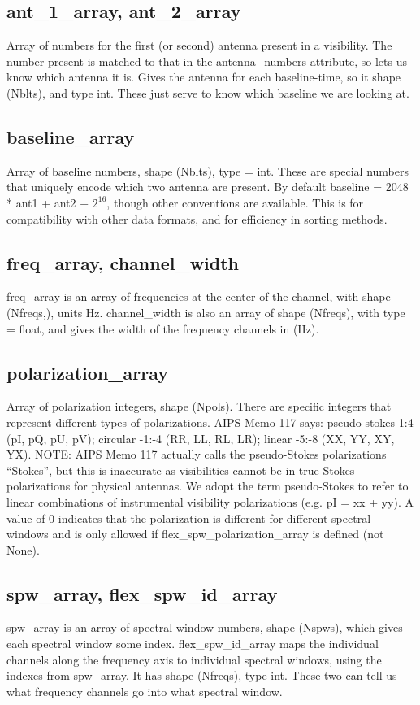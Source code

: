 \documentclass[12pt]{article}
\begin{document}
\subsection{ant\_1\_array, ant\_2\_array}
Array of numbers for the first (or second) antenna present in a visibility. 
The number present is matched to that in the antenna\_numbers attribute, so lets us know which antenna it is.
Gives the antenna for each baseline-time, so it shape (Nblts), and type int.
These just serve to know which baseline we are looking at.


\subsection{baseline\_array}
Array of baseline numbers, shape (Nblts), type = int.
These are special numbers that uniquely encode which two antenna are present.
By default baseline = 2048 * ant1 + ant2 + $2^16$, though other conventions are available. 
This is for compatibility with other data formats, and for efficiency in sorting methods.


\subsection{freq\_array, channel\_width}
freq\_array is an array of frequencies at the center of the channel, with shape (Nfreqs,), units Hz.
channel\_width is also an array of shape (Nfreqs), with type = float, and gives the width of the frequency channels in (Hz).


\subsection{polarization\_array}
Array of polarization integers, shape (Npols).
There are specific integers that represent different types of polarizations.
AIPS Memo 117 says: pseudo-stokes 1:4 (pI, pQ, pU, pV); circular -1:-4 (RR, LL, RL, LR); linear -5:-8 (XX, YY, XY, YX). 
NOTE: AIPS Memo 117 actually calls the pseudo-Stokes polarizations “Stokes”, but this is inaccurate as visibilities cannot be in true Stokes polarizations for physical antennas.
We adopt the term pseudo-Stokes to refer to linear combinations of instrumental visibility polarizations (e.g. pI = xx + yy). 
A value of 0 indicates that the polarization is different for different spectral windows and is only allowed if flex\_spw\_polarization\_array is defined (not None).


\subsection{spw\_array, flex\_spw\_id\_array}
spw\_array is an array of spectral window numbers, shape (Nspws), which gives each spectral window some index.
flex\_spw\_id\_array maps the individual channels along the frequency axis to individual spectral windows,
using the indexes from spw\_array. It has shape (Nfreqs), type int.
These two can tell us what frequency channels go into what spectral window.
\end{document}
